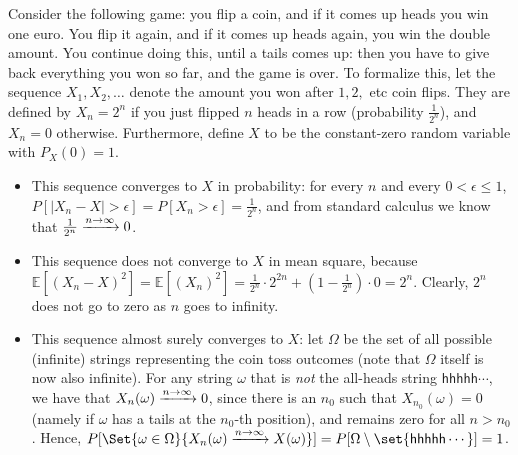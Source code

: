 \begin{example}
Consider the following game: you flip a coin, and if it comes up heads you win one euro. You flip it again, and if it comes up heads again, you win the double amount. You continue doing this, until a tails comes up: then you have to give back everything you won so far, and the game is over. To formalize this, let the sequence $X_1, X_2, \ldots$ denote the amount you won after $1, 2, $ etc coin flips. They are defined by $X_n = 2^n$ if you just flipped $n$ heads in a row (probability $\frac{1}{2^n}$), and $X_n = 0$ otherwise. Furthermore, define $X$ to be the constant-zero random variable with $P_X(0) = 1$.

\begin{itemize}
\item This sequence converges to $X$ in probability: for every $n$ and every $0 < \epsilon \leq 1$, $P[|X_n - X| > \epsilon] = P[X_n > \epsilon] = \frac{1}{2^n}$, and from standard calculus we know that $\frac{1}{2^n} \xrightarrow{n \to \infty} 0$.
\item This sequence does not converge to $X$ in mean square, because $\mathbb{E}[(X_n - X)^2] = \mathbb{E}[(X_n)^2] = \frac{1}{2^n} \cdot 2^{2n} + \left(1 - \frac{1}{2^n}\right) \cdot 0 = 2^n$. Clearly, $2^n$ does not go to zero as $n$ goes to infinity.
\item This sequence almost surely converges to $X$: let $\Omega$ be the set of all possible (infinite) strings representing the coin toss outcomes (note that $\Omega$ itself is now also infinite). For any string $\omega$ that is \emph{not} the all-heads string $\mathsf{hhhhh}\cdots$, we have that $X_n(\omega) \xrightarrow{n \to \infty} 0$, since there is an $n_0$ such that $X_{n_0}(\omega) = 0$ (namely if $\omega$ has a tails at the $n_0$-th position), and remains zero for all $n > n_0$. Hence, $P[\Set{\omega \in \Omega}{X_n(\omega) \convto X(\omega)}] = P[\Omega \setminus \set{\mathsf{hhhhh}\cdots}] = 1$.
\end{itemize}
\end{example}


